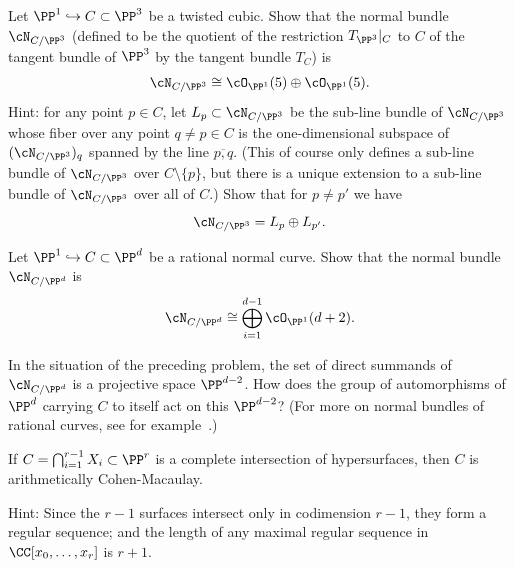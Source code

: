 
\begin{exercise}\label{Normal bundle of cubic}
Let $\PP^1 \hookrightarrow C \subset \PP^3$ be a twisted cubic. Show that the normal bundle $\cN_{C/\PP^3}$ (defined to be the quotient of the restriction $T_{\PP^3}|_C$ to $C$ of the tangent bundle  of $\PP^3$  by the tangent bundle $T_C$) is 
$$
\cN_{C/\PP^3} \cong \cO_{\PP^1}(5) \oplus  \cO_{\PP^1}(5).
$$
Hint: for any point $p \in C$, let $L_p \subset \cN_{C/\PP^3}$ be the sub-line bundle of $\cN_{C/\PP^3}$ whose fiber over any point $q \neq p \in C$ is the one-dimensional subspace of $(\cN_{C/\PP^3})_q$ spanned by the line $\overline{p,q}$. (This of course only defines a sub-line bundle of $\cN_{C/\PP^3}$ over $C \setminus \{p\}$, but there is a unique extension to a sub-line bundle of $\cN_{C/\PP^3}$ over all of $C$.) Show that for $p \neq p'$ we have
$$
\cN_{C/\PP^3} = L_p \oplus L_{p'}.
$$
\end{exercise}

\begin{exercise}
Let $\PP^1 \hookrightarrow C \subset \PP^d$ be a rational normal curve. Show that the normal bundle $\cN_{C/\PP^d}$  is 
$$
\cN_{C/\PP^d} \cong \bigoplus_{i=1}^{d-1} \cO_{\PP^1}(d+2).
$$
\end{exercise}

\begin{exercise}
In the situation of the preceding problem, the set  of direct summands of $\cN_{C/\PP^d} $ is a projective space $\PP^{d-2}$. How does the  group of automorphisms of $\PP^d$ carrying $C$ to itself act on this $\PP^{d-2}$?
(For more on normal bundles of rational curves, see for example~\cite{MR3778979}.)
\end{exercise}

\begin{exercise}\label{ci is acm}
If $C=\bigcap_{i = 1}^{r-1}X_i \subset \PP^r$ is a complete intersection of hypersurfaces,
then $C$ is arithmetically Cohen-Macaulay.

Hint: Since the $r-1$ surfaces intersect only in codimension $r-1$, they form
a regular sequence; and the length of any maximal regular sequence in 
$\CC[x_0,\dots, x_r]$ is $r+1$. \end{exercise}





